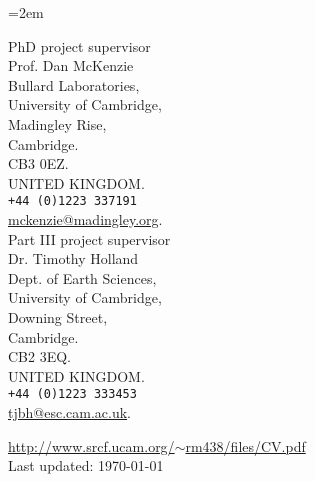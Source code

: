 \documentclass{scrartcl}	%
\newcommand{\Description}[1]{\hangindent=2em\footnotesize{#1}\par\normalsize}
\begin{document}
\begin{cv}
\Description{
\begin{multicols}{2}{
PhD project supervisor\\
Prof. Dan McKenzie\\
Bullard Laboratories,\\
University of Cambridge,\\
Madingley Rise,\\
Cambridge.\\
CB3 0EZ.\\
UNITED KINGDOM.\\
\texttt{+44 (0)1223 337191}\\
\href{mailto:mckenzie@madingley.org}{mckenzie@madingley.org}.\\
\columnbreak
Part III project supervisor\\
Dr. Timothy Holland\\
Dept. of Earth Sciences,\\
University of Cambridge,\\
Downing Street,\\
Cambridge.\\
CB2 3EQ.\\
UNITED KINGDOM.\\
\texttt{+44 (0)1223 333453}\\
\href{mailto:tjbh@esc.cam.ac.uk}{tjbh@esc.cam.ac.uk}.\\
}
\end{multicols}
}

\vfill

\begin{center}
{\footnotesize \href{http://www.srcf.ucam.org/~rm438/files/CV.pdf}{http://www.srcf.ucam.org/$\sim$rm438/files/CV.pdf}\\
Last updated: \today}
\end{center}



\enlargethispage{\baselineskip}
\end{cv}
\end{document}
